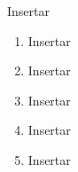 
Insertar



\newcommand{\oeOne}{Insertar}
\newcommand{\oeTwo}{Insertar}
\newcommand{\oeThree}{Insertar}
\newcommand{\oeFour}{Insertar}
\newcommand{\oeFive}{Insertar}
\begin{enumerate}
  \item \oeOne
  \item \oeTwo
  \item \oeThree
  \item \oeFour
  \item \oeFive
\end{enumerate}

\clearpage
